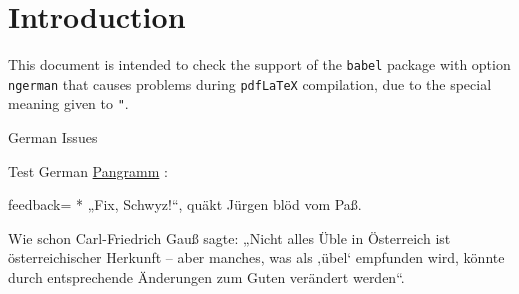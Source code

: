 \documentclass{article}
\def\myquestiontext{ \underline{Pangramm} :}
\def\pangramme{\glqq Fix, Schwyz!\grqq, qu\"akt J\"urgen bl\"od vom Pa\ss.}
\def\pangrammeother{Wie schon Carl-Friedrich Gau\ss\ sagte: \glqq Nicht 
  alles \"Uble in \"Osterreich ist \"osterreichischer Herkunft -- aber 
  manches, was als \glq \"ubel\grq\ empfunden wird, k\"onnte durch 
  entsprechende \"Anderungen zum Guten ver\"andert werden\grqq.}
\def\myfeedback{}
\def\myquestiontext{ \underline{Pangramm} :}
\def\pangramme{„Fix, Schwyz!“, quäkt Jürgen blöd vom Paß.}
\def\pangrammeother{Wie schon Carl-Friedrich Gauß sagte: „Nicht alles Üble in 
  Österreich ist österreichischer Herkunft – aber manches, was als ‚übel‘ 
  empfunden wird, könnte durch entsprechende Änderungen zum Guten verändert 
  werden“.}
\def\myfeedback{}
\begin{document}
\section*{Introduction}

This document is intended to check the support of the \texttt{babel} package 
with option \texttt{ngerman} that causes problems during \texttt{pdfLaTeX} 
compilation, due to the special meaning given to \verb|"|.

\begin{quiz}[points=1]{German Issues}
\begin{multi}[feedback={}]{Test German}
\myquestiontext
\item[feedback={\myfeedback}]* \pangramme
\item \pangrammeother
\end{multi}
\end{quiz}
\end{document}
